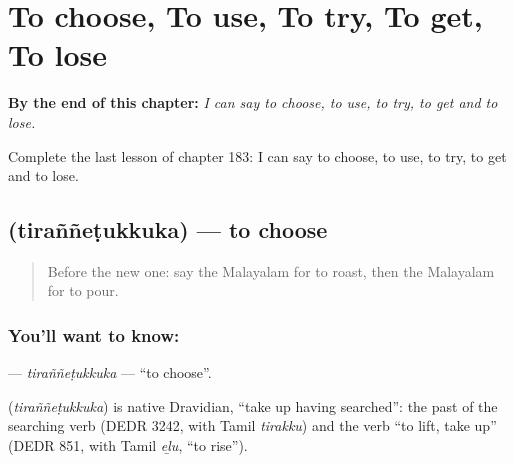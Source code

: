 
\chapter{To choose, To use, To try, To get, To lose}
\label{ch:ml-to-choose-to-use-to-try-to-get-to-lose}

\begin{chapteropening}
\textbf{By the end of this chapter:} \emph{I can say to choose, to use, to try, to get and to lose.}

Complete the last lesson of chapter 183: I can say to choose, to use, to try, to get and to lose.
\end{chapteropening}

\section[\texorpdfstring{\ml{തിരഞ്ഞെടുക്കുക} (tiraññeṭukkuka)}{തിരഞ്ഞെടുക്കുക (tiraññeṭukkuka)}]{ (tiraññeṭukkuka) — to choose}

\label{lesson:ML-C183-tirannetukkuka}



\begin{quote}
Before the new one: say the Malayalam for to roast, then the Malayalam for to pour.
\end{quote}

\subsection*{You'll want to know: }
\textbf{} — \emph{tiraññeṭukkuka} — \textquotedblleft{}to choose\textquotedblright{}.

\begin{cousinweb}
\textbf{} (\emph{tiraññeṭukkuka}) is native Dravidian, \textquotedblleft{}take up having searched\textquotedblright{}: the past of the searching verb (DEDR 3242, with Tamil \emph{tirakku}) and the verb \textquotedblleft{}to lift, take up\textquotedblright{} (DEDR 851, with Tamil \emph{eḻu}, \textquotedblleft{}to rise\textquotedblright{}).
\end{cousinweb}

